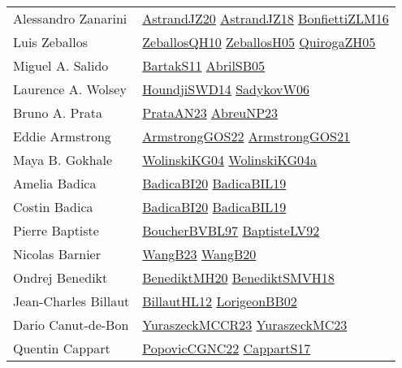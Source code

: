 {\begin{longtable}{p{4cm}p{20cm}}
Alessandro Zanarini & \href{articles/AstrandJZ20.pdf}{AstrandJZ20}\cite{AstrandJZ20} \href{papers/AstrandJZ18.pdf}{AstrandJZ18}\cite{AstrandJZ18} \href{papers/BonfiettiZLM16.pdf}{BonfiettiZLM16}\cite{BonfiettiZLM16} \\
Luis Zeballos & \href{articles/ZeballosQH10.pdf}{ZeballosQH10}\cite{ZeballosQH10} \href{articles/ZeballosH05.pdf}{ZeballosH05}\cite{ZeballosH05} \href{papers/QuirogaZH05.pdf}{QuirogaZH05}\cite{QuirogaZH05} \\
Miguel A. Salido & \href{articles/BartakS11.pdf}{BartakS11}\cite{BartakS11} \href{papers/AbrilSB05.pdf}{AbrilSB05}\cite{AbrilSB05} \\
Laurence A. Wolsey & \href{papers/HoundjiSWD14.pdf}{HoundjiSWD14}\cite{HoundjiSWD14} \href{}{SadykovW06}\cite{SadykovW06} \\
Bruno A. Prata & \href{articles/PrataAN23.pdf}{PrataAN23}\cite{PrataAN23} \href{}{AbreuNP23}\cite{AbreuNP23} \\
Eddie Armstrong & \href{papers/ArmstrongGOS22.pdf}{ArmstrongGOS22}\cite{ArmstrongGOS22} \href{papers/ArmstrongGOS21.pdf}{ArmstrongGOS21}\cite{ArmstrongGOS21} \\
Maya B. Gokhale & \href{papers/WolinskiKG04.pdf}{WolinskiKG04}\cite{WolinskiKG04} \href{}{WolinskiKG04a}\cite{WolinskiKG04a} \\
Amelia Badica & \href{}{BadicaBI20}\cite{BadicaBI20} \href{}{BadicaBIL19}\cite{BadicaBIL19} \\
Costin Badica & \href{}{BadicaBI20}\cite{BadicaBI20} \href{}{BadicaBIL19}\cite{BadicaBIL19} \\
Pierre Baptiste & \href{}{BoucherBVBL97}\cite{BoucherBVBL97} \href{papers/BaptisteLV92.pdf}{BaptisteLV92}\cite{BaptisteLV92} \\
Nicolas Barnier & \href{papers/WangB23.pdf}{WangB23}\cite{WangB23} \href{papers/WangB20.pdf}{WangB20}\cite{WangB20} \\
Ondrej Benedikt & \href{articles/BenediktMH20.pdf}{BenediktMH20}\cite{BenediktMH20} \href{papers/BenediktSMVH18.pdf}{BenediktSMVH18}\cite{BenediktSMVH18} \\
Jean{-}Charles Billaut & \href{papers/BillautHL12.pdf}{BillautHL12}\cite{BillautHL12} \href{}{LorigeonBB02}\cite{LorigeonBB02} \\
Dario Canut{-}de{-}Bon & \href{articles/YuraszeckMCCR23.pdf}{YuraszeckMCCR23}\cite{YuraszeckMCCR23} \href{papers/YuraszeckMC23.pdf}{YuraszeckMC23}\cite{YuraszeckMC23} \\
Quentin Cappart & \href{papers/PopovicCGNC22.pdf}{PopovicCGNC22}\cite{PopovicCGNC22} \href{papers/CappartS17.pdf}{CappartS17}\cite{CappartS17} \\

\end{longtable}}
